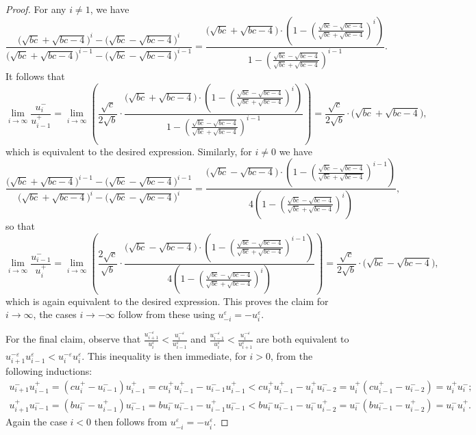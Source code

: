 \documentclass{amsart}
\numberwithin{theorem}{section}
\begin{document}
\begin{proof}
    For any $i\ne1$, we have
    \[\frac{\big(\sqrt{bc}+\sqrt{bc-4}\big)^i-\big(\sqrt{bc}-\sqrt{bc-4}\big)^i}{\big(\sqrt{bc}+\sqrt{bc-4}\big)^{i-1}-\big(\sqrt{bc}-\sqrt{bc-4}\big)^{i-1}}=\frac{\big(\sqrt{bc}+\sqrt{bc-4}\big)\cdot\left(1-\left(\frac{\sqrt{bc}-\sqrt{bc-4}}{\sqrt{bc}+\sqrt{bc-4}}\right)^i\right)}{1-\left(\frac{\sqrt{bc}-\sqrt{bc-4}}{\sqrt{bc}+\sqrt{bc-4}}\right)^{i-1}}.\]
    It follows that
    \[\lim_{i\to\infty} \frac{u_i^-}{u_{i-1}^+} = \lim_{i\to\infty} \left( \frac{\sqrt{c}}{2\sqrt{b}}\cdot\frac{\big(\sqrt{bc}+\sqrt{bc-4}\big)\cdot\left(1-\left(\frac{\sqrt{bc}-\sqrt{bc-4}}{\sqrt{bc}+\sqrt{bc-4}}\right)^i\right)}{1-\left(\frac{\sqrt{bc}-\sqrt{bc-4}}{\sqrt{bc}+\sqrt{bc-4}}\right)^{i-1}} \right) = \frac{\sqrt{c}}{2\sqrt{b}}\cdot\big(\sqrt{bc}+\sqrt{bc-4}\big),\]
    which is equivalent to the desired expression.
    Similarly, for $i\ne0$ we have
    \[\frac{\big(\sqrt{bc}+\sqrt{bc-4}\big)^{i-1}-\big(\sqrt{bc}-\sqrt{bc-4}\big)^{i-1}}{\big(\sqrt{bc}+\sqrt{bc-4}\big)^i-\big(\sqrt{bc}-\sqrt{bc-4}\big)^i}=\frac{\big(\sqrt{bc}-\sqrt{bc-4}\big)\cdot\left(1-\left(\frac{\sqrt{bc}-\sqrt{bc-4}}{\sqrt{bc}+\sqrt{bc-4}}\right)^{i-1}\right)}{4\left(1-\left(\frac{\sqrt{bc}-\sqrt{bc-4}}{\sqrt{bc}+\sqrt{bc-4}}\right)^i\right)},\]
    so that
    \[\lim_{i\to\infty} \frac{u_{i-1}^-}{u_i^+} = \lim_{i\to\infty} \left( \frac{2\sqrt{c}}{\sqrt{b}}\cdot\frac{\big(\sqrt{bc}-\sqrt{bc-4}\big)\cdot\left(1-\left(\frac{\sqrt{bc}-\sqrt{bc-4}}{\sqrt{bc}+\sqrt{bc-4}}\right)^{i-1}\right)}{4\left(1-\left(\frac{\sqrt{bc}-\sqrt{bc-4}}{\sqrt{bc}+\sqrt{bc-4}}\right)^i\right)} \right) = \frac{\sqrt{c}}{2\sqrt{b}}\cdot\big(\sqrt{bc}-\sqrt{bc-4}\big),\]
    which is again equivalent to the desired expression.
    This proves the claim for $i\to\infty$, the cases $i\to-\infty$ follow from these using $u_{-i}^\varepsilon=-u_i^\varepsilon$.

    For the final claim, observe that $\frac{u_{i+1}^{-\varepsilon}}{u_i^\varepsilon}<\frac{u_i^{-\varepsilon}}{u_{i-1}^\varepsilon}$ and $\frac{u_{i-1}^{-\varepsilon}}{u_i^\varepsilon}<\frac{u_i^{-\varepsilon}}{u_{i+1}^\varepsilon}$ are both equivalent to $u_{i+1}^{-\varepsilon}u_{i-1}^\varepsilon<u_i^{-\varepsilon}u_i^\varepsilon$.
    This inequality is then immediate, for $i>0$, from the following inductions:
    \begin{align*}
      u_{i+1}^{-}u_{i-1}^+
      =(cu_i^+-u_{i-1}^{-})u_{i-1}^+
      =cu_i^+ u_{i-1}^+-u_{i-1}^{-} u_{i-1}^+
      <cu_i^+ u_{i-1}^+-u_i^+ u_{i-2}^{-}
      =u_i^+(cu_{i-1}^+-u_{i-2}^{-})
      =u_i^+ u_i^{-};
      \\
      u_{i+1}^{+}u_{i-1}^-
      =(bu_i^--u_{i-1}^{+})u_{i-1}^-
      =bu_i^- u_{i-1}^--u_{i-1}^{+} u_{i-1}^-
      <bu_i^- u_{i-1}^--u_i^- u_{i-2}^{+}
      =u_i^-(bu_{i-1}^--u_{i-2}^{+})
      =u_i^- u_i^{+}.
    \end{align*}
    Again the case $i<0$ then follows from $u_{-i}^\varepsilon=-u_i^\varepsilon$.
  \end{proof}
\end{document}
